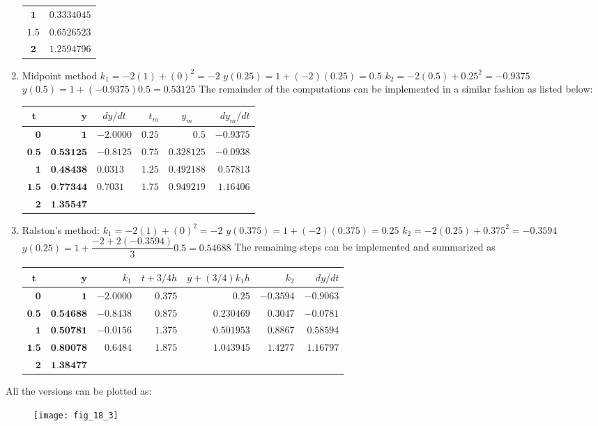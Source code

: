 \documentclass[../main.tex]{subfiles}
\begin{document}
\begin{enumerate}[label=\bfseries(\alph*)]
\begin{tabular}{cc}
$\mathbf{1}$&$\mathbf{0.3334045}$\\
$\mathbf{1.5}$&$\mathbf{0.6526523}$\\
$\mathbf{2}$&$\mathbf{1.2594796}$\\
\hline
\end{tabular}
	\bigbreak
\item  Midpoint method
	\bigbreak
$k_{1}=-2(1)+(0)^{2}=-2$
	\bigbreak
$y(0.25)=1+(-2)(0.25)=0.5$
	\bigbreak
$k_{2}=-2(0.5)+0.25^{2}=-0.9375$
	\bigbreak
$y(0.5)=1+(-0.9375) 0.5=0.53125$
	\bigbreak
The remainder of the computations can be implemented in a similar fashion as listed below:
	\bigbreak
\begin{tabular}{rrlrrr}
\hline
\multicolumn{1}{c}{$\boldsymbol{t}$} & $\boldsymbol{y}$ & \multicolumn{1}{c}{$d y / d t$} & $t_{m}$ & \multicolumn{1}{c}{$y_{m}$} & $d y_{m} / d t$ \\
\hline
$\mathbf{0}$ & $\mathbf{1}$ & $-2.0000$ & $0.25$ & $0.5$ & $-0.9375$ \\
$\mathbf{0 . 5}$ & $\mathbf{0 . 5 3 1 2 5}$ & $-0.8125$ & $0.75$ & $0.328125$ & $-0.0938$ \\
$\mathbf{1}$ & $\mathbf{0 . 4 8 4 3 8}$ & $0.0313$ & $1.25$ & $0.492188$ & $0.57813$ \\
$\mathbf{1 . 5}$ & $\mathbf{0 . 7 7 3 4 4}$ & $0.7031$ & $1.75$ & $0.949219$ & $1.16406$ \\
$\mathbf{2}$ & $\mathbf{1 . 3 5 5 4 7}$ &  &  &  &  \\
\hline
\end{tabular}
	\bigbreak
\item Ralston's method:
	\bigbreak
$k_{1}=-2(1)+(0)^{2}=-2$
	\bigbreak
$y(0.375)=1+(-2)(0.375)=0.25$
	\bigbreak
$k_{2}=-2(0.25)+0.375^{2}=-0.3594$
	\bigbreak
$y(0.25)=1+\dfrac{-2+2(-0.3594)}{3} 0.5=0.54688$
	\bigbreak
The remaining steps can be implemented and summarized as
	\bigbreak
\begin{tabular}{rrrrrrr}
\hline
\multicolumn{1}{c}{$\boldsymbol{t}$} & $\boldsymbol{y}$ & $k_{1}$ & $t+3 / 4 h$ & $y+(3 / 4) k_{1} h$ & $k_{2}$ & $d y / d t$ \\
\hline
$\mathbf{0}$ & $\mathbf{1}$ & $-2.0000$ & $0.375$ & $0.25$ & $-0.3594$ & $-0.9063$ \\
$\mathbf{0 . 5}$ & $\mathbf{0 . 5 4 6 8 8}$ & $-0.8438$ & $0.875$ & $0.230469$ & $0.3047$ & $-0.0781$ \\
$\mathbf{1}$ & $\mathbf{0 . 5 0 7 8 1}$ & $-0.0156$ & $1.375$ & $0.501953$ & $0.8867$ & $0.58594$ \\
$\mathbf{1 . 5}$ & $\mathbf{0 . 8 0 0 7 8}$ & $0.6484$ & $1.875$ & $1.043945$ & $1.4277$ & $1.16797$ \\
$\mathbf{2}$ & $\mathbf{1 . 3 8 4 7 7}$ &  &  &  &  &  \\
\hline
\end{tabular}
\end{enumerate}
	\bigbreak
All the versions can be plotted as:
	\bigbreak
	\begin{figure}[H]
		\texttt{[image: fig\_18\_3]}
		\label{fig:fig_18_3}
	\end{figure}
	\bigbreak
\end{document}
